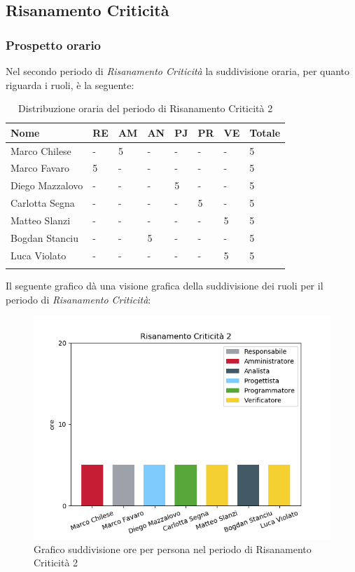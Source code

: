 \subsection{Risanamento Criticità}


\subsubsection{Prospetto orario}
Nel secondo periodo di \textit{Risanamento Criticità} la suddivisione oraria, per quanto riguarda i ruoli, è la seguente: 


\begin{longtable}{|C{.30\textwidth}|C{.06\textwidth}|C{.06\textwidth}|C{.06\textwidth} | C{.06\textwidth}| C{.06\textwidth} | C{.06\textwidth} | C{.10\textwidth} |}
\hline
\textbf{Nome} & \textbf{RE} & \textbf{AM} & \textbf{AN} & \textbf{PJ} & \textbf{PR} & \textbf{VE} & \textbf{Totale}\\
\hline 
Marco Chilese & - & 5 & - & - & - & - & 5 \\
\hline
Marco Favaro & 5 & - & - & - & - & - & 5 \\
\hline
Diego Mazzalovo & - & - & - & 5 & - & - & 5 \\
\hline
Carlotta Segna & - & - & - & - & 5 & - & 5 \\
\hline
Matteo Slanzi & - & - & - & - & - & 5 & 5 \\
\hline
Bogdan Stanciu & - & - & 5 & - & - & - & 5 \\
\hline
Luca Violato & - & - & - & - & - & 5 & 5 \\   
\hline


\caption{Distribuzione oraria del periodo di Risanamento Criticità 2}
\label{Distribuzione oraria rc2}
\end{longtable}

Il seguente grafico dà una visione grafica della suddivisione dei ruoli per il periodo di \textit{Risanamento Criticità}:\begin{figure}[H]
	\centering
  		\includegraphics[width=1\linewidth]{./images/fig_rc2.png}
  		\caption{Grafico suddivisione ore per persona nel periodo di Risanamento Criticità 2}
  		\label{fig:grafico suddivione ruoli rc2}
\end{figure}



